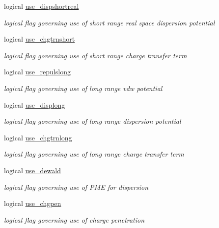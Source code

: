 \begin{DoxyCompactItemize}
logical \hyperlink{classpotent_a7583e8a20be4db641d1dcbfdce8d9fbf}{use\-\_\-dispshortreal}
\begin{DoxyCompactList}\small\item\em logical flag governing use of short range real space dispersion potential \end{DoxyCompactList}\item 
logical \hyperlink{classpotent_a8f475cebafbcffbafc52b364968fca6e}{use\-\_\-chgtrnshort}
\begin{DoxyCompactList}\small\item\em logical flag governing use of short range charge transfer term \end{DoxyCompactList}\item 
logical \hyperlink{classpotent_a3fc5cb2919b1f79f6d28865ee64941dd}{use\-\_\-repulslong}
\begin{DoxyCompactList}\small\item\em logical flag governing use of long range vdw potential \end{DoxyCompactList}\item 
logical \hyperlink{classpotent_a30c7aa564a7e6e64aadea0a17c50fcb7}{use\-\_\-displong}
\begin{DoxyCompactList}\small\item\em logical flag governing use of long range dispersion potential \end{DoxyCompactList}\item 
logical \hyperlink{classpotent_a40eee4d6a2e9b4621245a29d4d0e073b}{use\-\_\-chgtrnlong}
\begin{DoxyCompactList}\small\item\em logical flag governing use of long range charge transfer term \end{DoxyCompactList}\item 
logical \hyperlink{classpotent_af98f8da51858efb89951f38aface351c}{use\-\_\-dewald}
\begin{DoxyCompactList}\small\item\em logical flag governing use of P\-M\-E for dispersion \end{DoxyCompactList}\item 
logical \hyperlink{classpotent_a32e153c24445f68492ea39778aa11b25}{use\-\_\-chgpen}
\begin{DoxyCompactList}\small\item\em logical flag governing use of charge penetration \end{DoxyCompactList}\item 

\end{DoxyCompactItemize}
